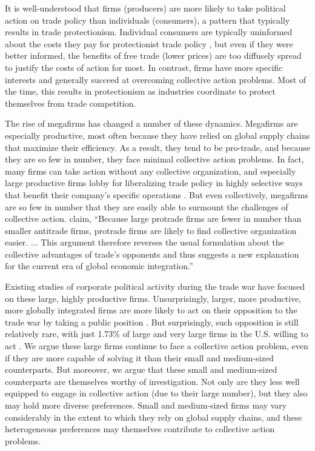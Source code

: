 \documentclass{article}
\begin{document}
It is well-understood that firms (producers) are more likely to take political action on trade policy than individuals (consumers), a pattern that typically results in trade protectionism. Individual consumers are typically uninformed about the costs they pay for protectionist trade policy \citep{guisinger2017american}, but even if they were better informed, the benefits of free trade (lower prices) are too diffusely spread to justify the costs of action for most. In contrast, firms have more specific interests and generally succeed at overcoming collective action problems. Most of the time, this results in protectionism as industries coordinate to protect themselves from trade competition.

The rise of megafirms has changed a number of these dynamics. Megafirms are especially productive, most often because they have relied on global supply chains that maximize their efficiency. As a result, they tend to be pro-trade, and because they are so few in number, they face minimal collective action problems. In fact, many firms can take action without any collective organization, and especially large productive firms lobby for liberalizing trade policy in highly selective ways that benefit their company's specific operations \citep{kim2017political}. But even collectively, megafirms are so few in number that they are easily able to surmount the challenges of collective action. \cite[409]{kim2019firms1} claim, ``Because large protrade firms are fewer in number than smaller antitrade firms, protrade firms are likely to find collective organization easier. ... This argument therefore reverses the usual formulation about the collective advantages of trade’s opponents and thus suggests a new explanation for the current era of global economic integration.'' 

Existing studies of corporate political activity during the trade war have focused on these large, highly productive firms. Unsurprisingly, larger, more productive, more globally integrated firms are more likely to act on their opposition to the trade war by taking a public position \citep{zhu2021firms,lee2021firms,vortherms2021political}. But surprisingly, such opposition is still relatively rare, with just 1.73\% of large and very large firms in the U.S. willing to act \citep{zhu2021firms}. We argue these large firms continue to face a collective action problem, even if they are more capable of solving it than their small and medium-sized counterparts. But moreover, we argue that these small and medium-sized counterparts are themselves worthy of investigation. Not only are they less well equipped to engage in collective action (due to their large number), but they also may hold more diverse preferences. Small and medium-sized firms may vary considerably in the extent to which they rely on global supply chains, and these heterogeneous preferences may themselves contribute to collective action problems.
\end{document}
